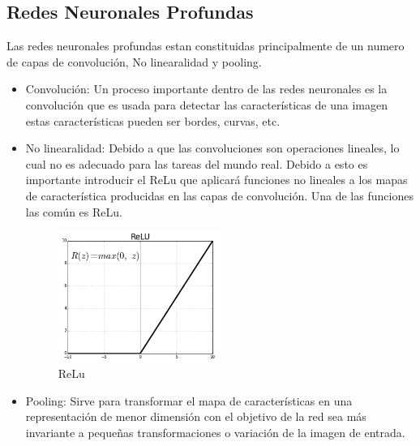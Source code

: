 \subsection{Redes Neuronales Profundas}


Las redes neuronales profundas estan constituidas principalmente de un numero de capas de convolución, No linearalidad y pooling.
\begin{itemize}
	\item Convolución:
	Un proceso importante dentro de las redes neuronales es la convolución que es usada para detectar las características de una imagen estas características pueden ser bordes, curvas, etc.
	\item No linearalidad:
	Debido a que las convoluciones son operaciones lineales, lo cual no es adecuado para las tareas del mundo real. Debido a esto es importante introducir el ReLu que aplicará funciones no lineales a los mapas de característica producidas en las capas de convolución.
	Una de las funciones las común es ReLu.
	\begin{figure}[H]
		\centering
		\includegraphics[width=0.5\textwidth]{Figures/relu.png}
		\caption{ReLu}
		\label{ReLu}
	\end{figure}

	
	\item Pooling:
	Sirve para transformar el mapa de características en una representación de menor dimensión con el objetivo de la red sea más invariante a pequeñas transformaciones o variación de la imagen de entrada.
\end{itemize}






\afterpage{\blankpage}